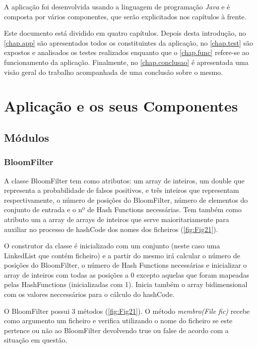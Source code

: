 \documentclass{report}
\begin{document}
 A aplicação foi desenvolvida usando a linguagem de programação {\itshape Java} e é composta por vários componentes, que serão explicitados nos capítulos à frente.

Este documento está dividido em quatro capítulos.
Depois desta introdução,
no \autoref{chap.app} são apresentados todos os constituintes da aplicação,
no \autoref{chap.test} são expostos e analisados os testes realizados enquanto que o \autoref{chap.func} refere-se ao funcionamento da aplicação.
Finalmente, no \autoref{chap.conclusao} é apresentada uma visão geral do trabalho acompanhada de uma conclusão sobre o mesmo.




\chapter{Aplicação e os seus Componentes}
\label{chap.app}
\section{Módulos}
\subsection{BloomFilter}
A classe BloomFilter tem como atributos: um array de inteiros, um double que representa a probabilidade de falsos positivos, e três inteiros que representam respectivamente, o número de posições do BloomFilter, número de elementos do conjunto de entrada e o nº de Hash Functions necessárias. Tem também como atributo um a array de arrays de inteiros que serve maioritariamente para auxiliar no processo de hashCode dos nomes dos ficheiros (\autoref{fig:Fig21}).

O construtor da classe é inicializado com um conjunto (neste caso uma LinkedList que contém ficheiro) e a partir do mesmo irá calcular o número de posições do BloomFilter, o número de Hash Functions necessárias e inicializar o array de inteiros com todas as posições a 0 excepto aquelas que foram mapeadas pelas HashFunctions (inicializadas com 1). Inicia também o array bidimensional com os valores neccessários para o cálculo do hashCode. 

O BloomFilter possui 3 métodos (\autoref{fig:Fig21}). O método {\itshape membro(File fic)} recebe como argumento um ficheiro e verifica utilizando o nome do ficheiro se este pertence ou não ao BloomFilter devolvendo true ou false de acordo com a situação em questão.
\end{document}
